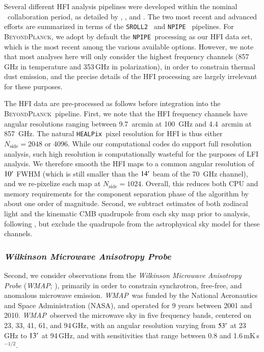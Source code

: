 \documentclass[twocolumn]{aa}
\def\WMAP{\emph{WMAP}}
\newcommand{\BP}{\textsc{BeyondPlanck}}
\newcommand{\npipe}[0]{\texttt{NPIPE}}
\newcommand{\srollTwo}[0]{\texttt{SROLL2}}
\newcommand{\HEALPix}[0]{\texttt{HEALPix}}
\begin{document}
Several different HFI analysis pipelines were developed within the
nominal \Planck\ collaboration period, as detailed by
\citet{planck2013-p03}, \citet{planck2014-a08}, and
\citet{planck2016-l03}. The two most recent and advanced efforts are
summarized in terms of the \srollTwo\ \citep{delouis:2019} and
\npipe\ \citep{planck2020-LVII} pipelines. For \BP, we adopt by default the
\npipe\ processing as our HFI data set, which is the most recent among
the various available options. However, we note that most analyses here
will only consider the highest frequency channels (857\,GHz in
temperature and 353\,GHz in polarization), in order to constrain
thermal dust emission, and the precise details of the HFI processing
are largely irrelevant for these purposes.

The HFI data are pre-processed as follows before integration into the
\BP\ pipeline. First, we note that the HFI frequency channels have
angular resolutions ranging between 9.7~arcmin at 100~GHz and
4.4~arcmin at 857~GHz. The natural \HEALPix\ pixel resolution for HFI
is thus either $N_{\mathrm{side}}=2048$ or 4096. While our
computational codes do support full resolution analysis, such high
resolution is computationally wasteful for the purposes of LFI
analysis. We therefore smooth the HFI maps to a common angular
resolution of $10\arcm$ FWHM (which is still smaller than the
$14\arcm$ beam of the 70~GHz channel), and we re-pixelize each map at
$N_{\mathrm{side}}=1024$. Overall, this reduces both CPU and memory
requirements for the component separation phase of the algorithm by
about one order of magnitude. Second, we subtract estimates of both
zodiacal light and the kinematic CMB quadrupole from each sky map
prior to analysis, following \citet{planck2020-LVII}, but exclude the
quadrupole from the astrophysical sky model for these channels.


\subsubsection{\emph{Wilkinson Microwave Anisotropy Probe}}

Second, we consider observations from the \emph{Wilkinson Microwave
  Anisotropy Probe} (\WMAP; \citealp{bennett2012}), primarily in order
to constrain synchrotron, free-free, and anomalous microwave
emission. \WMAP\ was funded by the National Aeronautics and Space
Administration (NASA), and operated for 9 years between 2001 and
2010. \WMAP\ observed the microwave sky in five frequency bands,
centered on 23, 33, 41, 61, and 94\,GHz, with an angular resolution
varying from $53\arcm$ at 23\,GHz to $13\arcm$ at 94\,GHz, and with
sensitivities that range between 0.8 and 1.6\,mK\,s$^{-1/2}$.
\end{document}
